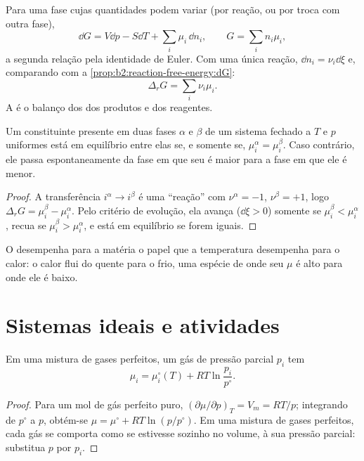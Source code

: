 Para uma fase cujas quantidades podem variar (por reação, ou por troca com
outra fase),
\[
  \dd G = V\dd p - S\dd T + \sum_i\mu_i\,\dd n_i ,\qquad G = \sum_i n_i\mu_i ,
\]
a segunda relação pela identidade de Euler. Com uma única reação, $\dd n_i =
\nu_i\dd\xi$ e, comparando com a \cref{prop:b2:reaction-free-energy:dG}:
\[
  \Delta_r G = \sum_i\nu_i\mu_i .
\]
A  é o balanço dos  dos
produtos e dos reagentes.

\begin{theorem}\label{thm:b2:chemical-potential:phase-equilibrium}
Um constituinte presente em duas fases $\alpha$ e $\beta$ de um sistema fechado a
$T$ e $p$ uniformes está em equilíbrio entre elas se, e somente se,
$\mu_i^\alpha = \mu_i^\beta$. Caso contrário, ele passa espontaneamente da
fase em que seu  é maior para a fase em que ele é menor.
\end{theorem}

\begin{proof}
A transferência $i^\alpha \to i^\beta$ é uma ``reação'' com $\nu^\alpha = -1$,
$\nu^\beta = +1$, logo $\Delta_r G = \mu_i^\beta - \mu_i^\alpha$. Pelo
critério de evolução, ela avança ($\dd\xi > 0$) somente se $\mu_i^\beta <
\mu_i^\alpha$, recua se $\mu_i^\beta > \mu_i^\alpha$, e está em
equilíbrio se forem iguais.
\end{proof}

O  desempenha para a matéria o papel que a temperatura
desempenha para o calor: o calor flui do quente para o frio, uma espécie de
onde seu $\mu$ é alto para onde ele é baixo.

\section{Sistemas ideais e atividades}

\begin{proposition}\label{prop:b2:chemical-potential:mu-gas}
Em uma mistura de gases perfeitos, um gás de pressão parcial $p_i$ tem
\[
  \mu_i = \mu_i^\circ(T) + RT\ln\frac{p_i}{p^\circ} .
\]
\end{proposition}

\begin{proof}
Para um mol de gás perfeito puro, $(\partial\mu/\partial p)_T = V_m =
RT/p$; integrando de $p^\circ$ a $p$, obtém-se $\mu = \mu^\circ + RT\ln(p/p^\circ)$.
Em uma mistura de gases perfeitos, cada gás se comporta como se estivesse
sozinho no volume, à sua pressão parcial: substitua $p$ por $p_i$.
\end{proof}

